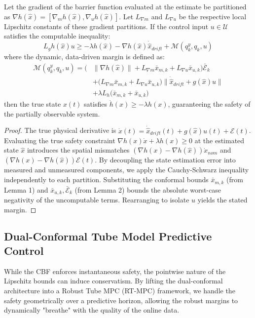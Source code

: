 \documentclass[letterpaper, 10 pt, conference]{ieeeconf}  %
\begin{document}
\begin{theorem}
Let the gradient of the barrier function evaluated at the estimate be partitioned as $\nabla h(\hat{x}) = [\nabla_m h(\hat{x}), \nabla_u h(\hat{x})]$. Let $L_{\nabla m}$ and $L_{\nabla u}$ be the respective local Lipschitz constants of these gradient partitions. If the control input $u \in \mathcal{U}$ satisfies the computable inequality:
\begin{equation}
    L_g h(\hat{x}) u \ge -\lambda h(\hat{x}) - \nabla h(\hat{x})\dot{\hat{x}}_{drift} + \mathcal{M}(q^y_k, q_k, u)
\end{equation}
where the dynamic, data-driven margin is defined as:
\begin{align}
    \mathcal{M}(q^y_k, q_k, u) = \Big( &\|\nabla h(\hat{x})\| + L_{\nabla m}\bar{x}_{m,k} + L_{\nabla u}\bar{x}_{u,k} \Big)\bar{\mathcal{E}}_k \nonumber \\
    &+ \Big( L_{\nabla m}\bar{x}_{m,k} + L_{\nabla u}\bar{x}_{u,k} \Big) \|\dot{\hat{x}}_{drift} + g(\hat{x})u\| \nonumber \\
    &+ \lambda L_h \Big( \bar{x}_{m,k} + \bar{x}_{u,k} \Big)
\end{align}
then the true state $x(t)$ satisfies $\dot{h}(x) \ge -\lambda h(x)$, guaranteeing the safety of the partially observable system.
\end{theorem}
\begin{proof}
The true physical derivative is $\dot{x}(t) = \dot{\hat{x}}_{drift}(t) + g(\hat{x})u(t) + \mathcal{E}(t)$. Evaluating the true safety constraint $\nabla h(x)\dot{x} + \lambda h(x) \ge 0$ at the estimated state $\hat{x}$ introduces the spatial mismatches $(\nabla h(x) - \nabla h(\hat{x}))\dot{x}_{nom}$ and $(\nabla h(x) - \nabla h(\hat{x}))\mathcal{E}(t)$. By decoupling the state estimation error into measured and unmeasured components, we apply the Cauchy-Schwarz inequality independently to each partition. Substituting the conformal bounds $\bar{x}_{m,k}$ (from Lemma 1) and $\bar{x}_{u,k}, \bar{\mathcal{E}}_k$ (from Lemma 2) bounds the absolute worst-case negativity of the uncomputable terms. Rearranging to isolate $u$ yields the stated margin.
\end{proof}

\subsection{Dual-Conformal Tube Model Predictive Control}

While the CBF enforces instantaneous safety, the pointwise nature of the Lipschitz bounds can induce conservatism. By lifting the dual-conformal architecture into a Robust Tube MPC (RT-MPC) framework, we handle the safety geometrically over a predictive horizon, allowing the robust margins to dynamically "breathe" with the quality of the online data.
\end{document}
